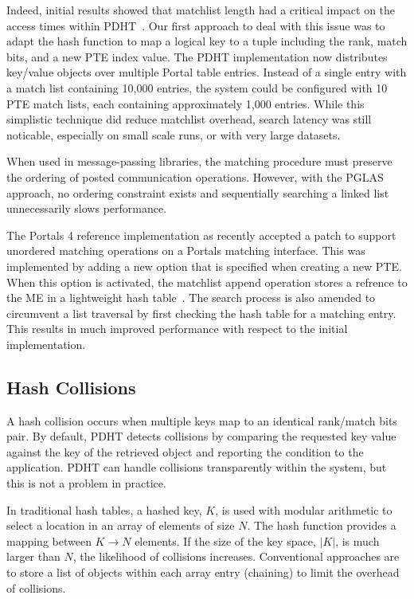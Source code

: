 Indeed, initial results showed that matchlist length had a critical 
impact on the access times within PDHT~\cite{comhpc16}. Our first
approach to deal with this issue was to adapt the hash function
to map a logical key to a tuple including the rank, match bits, and 
a new PTE index value. The PDHT implementation now distributes
key/value objects over multiple Portal table entries. Instead of 
a single entry with a match list containing 10,000 entries, the
system could be configured with 10 PTE match lists, each containing
approximately 1,000 entries. While this simplistic technique did
reduce matchlist overhead, search latency was still noticable, 
especially on small scale runs, or with very large datasets.


When used in message-passing libraries, the matching procedure must preserve
the ordering of posted communication operations. However, with the PGLAS
approach, no ordering constraint exists and sequentially searching a linked
list unnecessarily slows performance.

The Portals 4 reference implementation as recently accepted a patch
to support unordered matching operations on a Portals matching interface.
This was implemented by adding a new option that is specified when
creating a new PTE. When this option is activated, the matchlist
append operation stores a refrence to the ME in a lightweight 
hash table~\cite{uthash}.  The search process is also amended to circumvent 
a list traversal by first checking the hash table for a matching entry.
This results in much improved performance with respect to the initial
implementation.

\subsection{Hash Collisions} 

A hash collision occurs when multiple keys map to an identical rank/match bits
pair. By default, PDHT detects collisions by comparing the requested key value
against the key of the retrieved object and reporting the condition to the
application. PDHT can handle collisions transparently within the system, but
this is not a problem in practice.

In traditional hash tables, a hashed key, $K$, is used with modular arithmetic
to select a location in an array of elements of size $N$. The hash function
provides a mapping between $K \rightarrow N$ elements.  If the size of the key
space, $|K|$, is much larger than $N$, the likelihood of collisions increases.
Conventional approaches are to store a list of objects within each array entry
(chaining) to limit the overhead of collisions.

